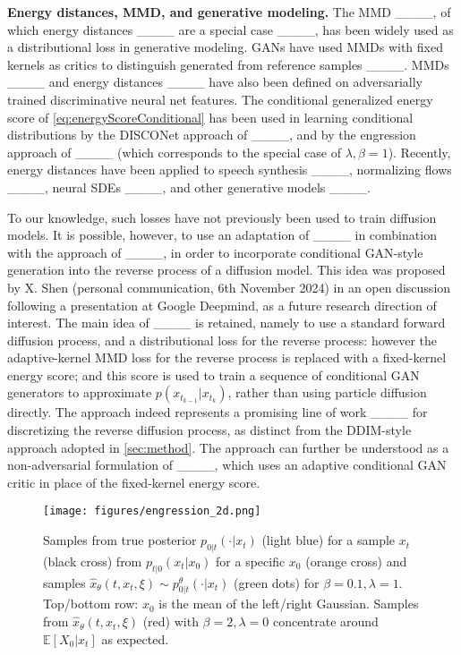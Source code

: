 \textbf{Energy distances, MMD, and generative modeling.}
The MMD ____, of which energy distances ____ are a special case ____, has been widely used as a distributional loss in generative modeling. GANs have used MMDs with fixed kernels as critics to distinguish generated from reference samples ____. MMDs ____ and energy distances ____ have also been defined on adversarially trained discriminative neural net features.
The conditional generalized energy score of \eqref{eq:energyScoreConditional} has been used in learning conditional distributions by the DISCONet approach of ____,  and by the engression approach of ____ 
(which corresponds to the special case of $\lambda,\beta=1$). Recently, energy distances have been applied to speech synthesis ____, normalizing flows ____, neural SDEs ____, and other generative models ____.

To our knowledge, such losses have not previously been used to train diffusion models.
It is possible, however, to use an adaptation of  ____  in combination with the approach of ____, in order to incorporate conditional GAN-style generation into the reverse process of a diffusion model.  This idea was proposed by X. Shen  (personal communication, 6th November 2024) in an open  discussion following a presentation at Google Deepmind, as a future research direction of interest. The main idea of ____ is retained, namely to use a standard forward diffusion  process, and a distributional loss for the reverse process: however the adaptive-kernel MMD loss for the reverse process is replaced with a fixed-kernel energy score; and this score is used to train a sequence of conditional GAN generators to approximate $p(x_{t_{k-1}} |x_{t_{k}})$, rather than using particle diffusion directly. The approach indeed represents a promising line of work ____ for discretizing the reverse diffusion process, as distinct from the DDIM-style approach adopted in  \cref{sec:method}. The approach can further be understood as a non-adversarial formulation of  ____, which uses an adaptive conditional GAN critic in place of the fixed-kernel energy score.

\begin{figure}
    \centering
        \texttt{[image: figures/engression\_2d.png]}
    \caption{Samples from true posterior $p_{0 \vert t}(\cdot | x_t)$ (light blue) for a sample $x_t$ (black cross) from $p_ {t|0}(x_t|x_0)$ for a specific $x_0$ (orange cross) and samples $\hat{x}_{\theta}(t,x_{t},\xi) \sim p^\theta_{0|t}(\cdot|x_t)$ (green dots) for $\beta=0.1,\lambda=1$.  Top/bottom row: $x_0$ is the mean of the left/right Gaussian. Samples from $\hat{x}_{\theta}(t,x_{t},\xi)$ (red) with $\beta=2,\lambda=0$ concentrate around $\mathbb{E}[X_0 | x_t]$ as expected.}
    \label{fig:trajectories_2d}
\end{figure}